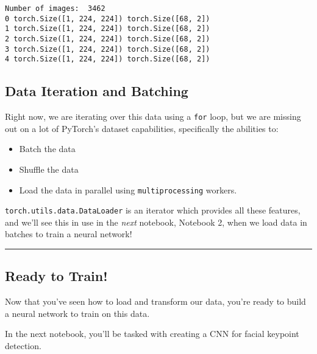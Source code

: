 \documentclass[11pt]{article}
\providecommand{\tightlist}{%
      \setlength{\itemsep}{0pt}\setlength{\parskip}{0pt}}
\begin{document}
    \begin{Verbatim}[commandchars=\\\{\}]
Number of images:  3462
0 torch.Size([1, 224, 224]) torch.Size([68, 2])
1 torch.Size([1, 224, 224]) torch.Size([68, 2])
2 torch.Size([1, 224, 224]) torch.Size([68, 2])
3 torch.Size([1, 224, 224]) torch.Size([68, 2])
4 torch.Size([1, 224, 224]) torch.Size([68, 2])

    \end{Verbatim}

    \subsection{Data Iteration and
Batching}\label{data-iteration-and-batching}

Right now, we are iterating over this data using a \texttt{for} loop,
but we are missing out on a lot of PyTorch's dataset capabilities,
specifically the abilities to:

\begin{itemize}
\tightlist
\item
  Batch the data
\item
  Shuffle the data
\item
  Load the data in parallel using \texttt{multiprocessing} workers.
\end{itemize}

\texttt{torch.utils.data.DataLoader} is an iterator which provides all
these features, and we'll see this in use in the \emph{next} notebook,
Notebook 2, when we load data in batches to train a neural network!

\begin{center}\rule{0.5\linewidth}{\linethickness}\end{center}

    \subsection{Ready to Train!}\label{ready-to-train}

Now that you've seen how to load and transform our data, you're ready to
build a neural network to train on this data.

In the next notebook, you'll be tasked with creating a CNN for facial
keypoint detection.


    
    
    
    
\end{document}
